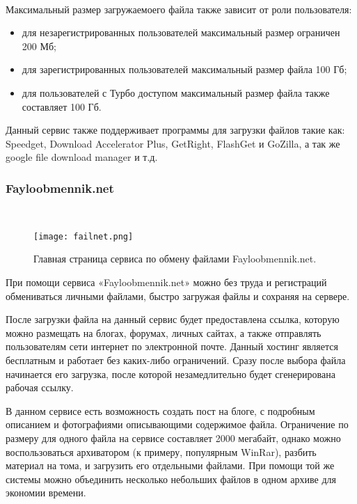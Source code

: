~\\Максимальный размер загружаемоего файла также зависит от роли пользователя:
\begin{itemize}
  \item для незарегистрированных пользователей максимальный размер ограничен 200 Мб;
  \item для зарегистрированных пользователей максимальный размер файла 100 Гб;
  \item для пользователей с Турбо доступом максимальный размер файла также составляет 100 Гб.
\end{itemize}

Данный сервис также поддерживает программы для загрузки файлов такие как: Speedget, Download Accelerator Plus, GetRight, FlashGet и GoZilla, а так же google file download manager и т.д.

\subsubsection{Fayloobmennik.net}~\\
\label{sec:practice:itechart_characteristic:filenet}

\begin{figure}[ht]
  \centering
  \texttt{[image: failnet.png]}  
    \caption{ Главная страница сервиса по обмену файлами Fayloobmennik.net. }
    \label{fig:rghost}
\end{figure}

При помощи сервиса «Fayloobmennik.net» можно без труда и регистраций обмениваться личными файлами, быстро загружая файлы и сохраняя на сервере. 

После загрузки файла на данный сервис будет предоставлена ссылка, которую можно размещать на блогах, форумах, личных сайтах, а также отправлять пользователям сети интернет по электронной почте. Данный хостинг является бесплатным и работает без каких-либо ограничений. Сразу после выбора файла начинается его загрузка, после которой незамедлительно будет сгенерирована рабочая ссылку. 

В данном сервисе есть возможность создать пост на блоге, с подробным описанием и фотографиями описывающими содержимое файла. Ограничение по размеру для одного файла на сервисе составляет 2000 мегабайт, однако можно  воспользоваться архиватором (к примеру, популярным WinRar), разбить материал на тома, и загрузить его отдельными файлами. При помощи той же системы можно объединить несколько небольших файлов в одном архиве для экономии времени.

